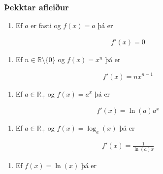 \documentclass[a4paper,10pt,icelandic]{sphinxmanual}
\begin{document}
\subsubsection{Þekktar afleiður}
\label{\detokenize{Kafli12:ekktar-afleiur}}\begin{enumerate}
%
\item {} 
Ef \(a\) er fasti og \(f(x)=a\) þá er

\end{enumerate}
\begin{equation*}
\begin{split}f'(x)=0\end{split}
\end{equation*}\begin{enumerate}
%
\setcounter{enumi}{1}
\item {} 
Ef \(n\in \mathbb{R}\setminus\{0\}\) og \(f(x)=x^n\) þá er

\end{enumerate}
\begin{equation*}
\begin{split}f'(x)=nx^{n-1}\end{split}
\end{equation*}\begin{enumerate}
%
\setcounter{enumi}{2}
\item {} 
Ef \(a\in \mathbb{R}_+\) og \(f(x)=a^x\) þá er

\end{enumerate}
\begin{equation*}
\begin{split}f'(x)=\ln(a)a^x\end{split}
\end{equation*}\begin{enumerate}
%
\setcounter{enumi}{3}
\item {} 
Ef \(a\in \mathbb{R}_+\) og \(f(x)=\log_a(x)\) þá er

\end{enumerate}
\begin{equation*}
\begin{split}f'(x)=\frac{1}{\ln(a)x}\end{split}
\end{equation*}\begin{enumerate}
%
\setcounter{enumi}{4}
\item {} 
Ef \(f(x) = \ln(x)\) þá er

\end{enumerate}
\end{document}
